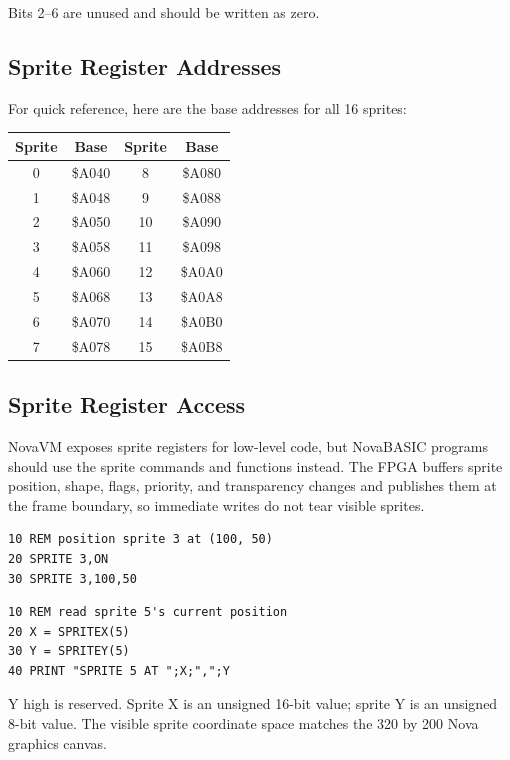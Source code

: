 Bits 2--6 are unused and should be written as zero.

\subsection*{Sprite Register Addresses}

For quick reference, here are the base addresses for all 16 sprites:

\begin{center}
\small
\begin{tabular}{@{}cccc@{}}
\toprule
\textbf{Sprite} & \textbf{Base} & \textbf{Sprite} & \textbf{Base} \\
\midrule
0  & \$A040 & 8  & \$A080 \\
1  & \$A048 & 9  & \$A088 \\
2  & \$A050 & 10 & \$A090 \\
3  & \$A058 & 11 & \$A098 \\
4  & \$A060 & 12 & \$A0A0 \\
5  & \$A068 & 13 & \$A0A8 \\
6  & \$A070 & 14 & \$A0B0 \\
7  & \$A078 & 15 & \$A0B8 \\
\bottomrule
\end{tabular}
\end{center}

\subsection*{Sprite Register Access}

NovaVM exposes sprite registers for low-level code, but NovaBASIC programs
should use the sprite commands and functions instead.  The FPGA buffers sprite
position, shape, flags, priority, and transparency changes and publishes them at
the frame boundary, so immediate writes do not tear visible sprites.

\begin{lstlisting}
10 REM position sprite 3 at (100, 50)
20 SPRITE 3,ON
30 SPRITE 3,100,50
\end{lstlisting}

\begin{lstlisting}
10 REM read sprite 5's current position
20 X = SPRITEX(5)
30 Y = SPRITEY(5)
40 PRINT "SPRITE 5 AT ";X;",";Y
\end{lstlisting}

\begin{notebox}
Y high is reserved.  Sprite X is an unsigned 16-bit value; sprite Y is an
unsigned 8-bit value.  The visible sprite coordinate space matches the
320 by 200 Nova graphics canvas.
\end{notebox}

